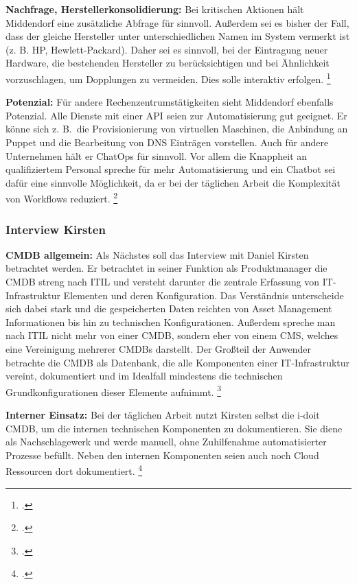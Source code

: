 \textbf{Nachfrage, Herstellerkonsolidierung: } Bei kritischen Aktionen hält Middendorf eine zusätzliche Abfrage für sinnvoll. Außerdem sei es bisher der Fall, dass der gleiche Hersteller unter unterschiedlichen Namen im System vermerkt ist (z. B. HP, Hewlett-Packard). Daher sei es sinnvoll, bei der Eintragung neuer Hardware, die bestehenden Hersteller zu berücksichtigen und bei Ähnlichkeit vorzuschlagen, um Dopplungen zu vermeiden. Dies solle interaktiv erfolgen.
\footcite[Vgl.][o. \pno]{Midd_2019}

\textbf{Potenzial: } Für andere Rechenzentrumstätigkeiten sieht Middendorf ebenfalls Potenzial. Alle Dienste mit einer API seien zur Automatisierung gut geeignet. Er könne sich z. B.~die Provisionierung von virtuellen Maschinen, die Anbindung an Puppet und die Bearbeitung von DNS Einträgen vorstellen. Auch für andere Unternehmen hält er ChatOps für sinnvoll. Vor allem die Knappheit an qualifiziertem Personal spreche für mehr Automatisierung und ein Chatbot sei dafür eine sinnvolle Möglichkeit, da er bei der täglichen Arbeit die Komplexität von Workflows reduziert.
\footcite[Vgl.][o. \pno]{Midd_2019}



\subsubsection{Interview Kirsten}
\textbf{CMDB allgemein: }Als Nächstes soll das Interview mit Daniel Kirsten betrachtet werden. Er betrachtet in seiner Funktion als Produktmanager die \acs{CMDB} streng nach \acs{ITIL} und versteht darunter die zentrale Erfassung von IT-Infrastruktur Elementen und deren Konfiguration. Das Verständnis unterscheide sich dabei stark und die gespeicherten Daten reichten von Asset Management Informationen bis hin zu technischen Konfigurationen. Außerdem spreche man nach \acs{ITIL} nicht mehr von einer \acs{CMDB}, sondern eher von einem \acf{CMS}, welches eine Vereinigung mehrerer \acsp{CMDB} darstellt. Der Großteil der Anwender betrachte die \acs{CMDB} als Datenbank, die \glqq{}alle Komponenten einer IT-Infrastruktur vereint, dokumentiert und im Idealfall mindestens die technischen Grundkonfigurationen dieser Elemente aufnimmt.\grqq 
\footcites[][o. \pno]{Kirsten_2019}[Vgl.][o. \pno]{Kirsten_2019}

\textbf{Interner Einsatz: }Bei der täglichen Arbeit nutzt Kirsten selbst die i-doit \acs{CMDB}, um die internen technischen Komponenten zu dokumentieren. Sie diene als Nachschlagewerk und werde manuell, ohne Zuhilfenahme automatisierter Prozesse befüllt. Neben den internen Komponenten seien auch noch Cloud Ressourcen dort dokumentiert. 
\footcite[Vgl.][o. \pno]{Kirsten_2019}

